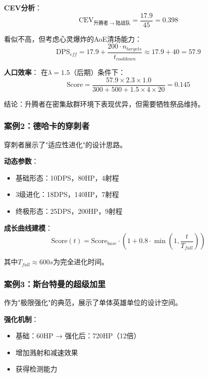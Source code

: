 \documentclass[a4paper,12pt]{article}
\begin{document}
\textbf{CEV分析}：
\begin{equation}
\text{CEV}_{升腾者 \rightarrow 陆战队} = \frac{17.9}{45} = 0.398
\end{equation}

看似不高，但考虑心灵爆炸的AoE清场能力：
\begin{equation}
\text{DPS}_{eff} = 17.9 + \frac{200 \cdot n_{targets}}{t_{cooldown}} \approx 17.9 + 40 = 57.9
\end{equation}

\textbf{人口效率}：
在$\lambda = 1.5$（后期）条件下：
\begin{equation}
\text{Score} = \frac{57.9 \times 2.3 \times 1.0}{300 + 500 + 1.5 \times 4 \times 20} = 0.145
\end{equation}

结论：升腾者在密集敌群环境下表现优异，但需要牺牲祭品维持。

\subsubsection{案例2：德哈卡的穿刺者}
穿刺者展示了"适应性进化"的设计思路。

\textbf{动态参数}：
\begin{itemize}
\item 基础形态：10DPS，80HP，4射程
\item 3级进化：18DPS，140HP，7射程
\item 终极形态：25DPS，200HP，9射程
\end{itemize}

\textbf{成长曲线建模}：
\begin{equation}
\text{Score}(t) = \text{Score}_{base} \cdot (1 + 0.8 \cdot \min(1, \frac{t}{T_{full}}))
\end{equation}

其中$T_{full} \approx 600s$为完全进化时间。

\subsubsection{案例3：斯台特曼的超级加里}
作为"极限强化"的典范，展示了单体英雄单位的设计空间。

\textbf{强化机制}：
\begin{itemize}
\item 基础：60HP → 强化后：720HP（12倍）
\item 增加溅射和减速效果
\item 获得检测能力
\end{itemize}
\end{document}
